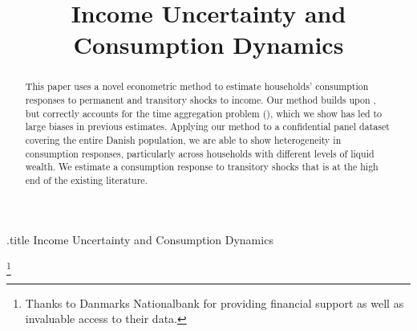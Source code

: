 \documentclass[titlepage]{\econtex}\newcommand{\texname}{IncomeUncertainty}
\begin{document}




\begin{verbatimwrite}{\jobname.title}
Income Uncertainty and Consumption Dynamics
\end{verbatimwrite}

\hfill{\tiny \jobname}

\title{Income Uncertainty and \\ Consumption Dynamics}



\maketitle

\begin{abstract}
    This paper uses a novel econometric method to estimate households' consumption responses to permanent and transitory shocks to income. Our method builds upon \cite{blundell_consumption_2008}, but correctly accounts for the time aggregation problem (\cite{working_note_1960}), which we show has led to large biases in previous estimates. Applying our method to a confidential panel dataset covering the entire Danish population, we are able to show heterogeneity in consumption responses, particularly across households with different levels of liquid wealth. We estimate a consumption response to transitory shocks that is at the high end of the existing literature.
%  
\end{abstract}


\begin{authorsinfo}
\end{authorsinfo}
\thanks{Thanks to Danmarks Nationalbank for providing financial support as well as invaluable access to their data.}
\end{document}
